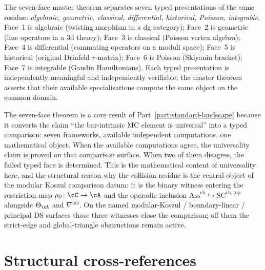 \begin{remark}
\label{rem:hdm-methodological-hierarchy}
The seven-face master theorem separates seven typed presentations of
the same residue: \emph{algebraic, geometric, classical, differential,
historical, Poisson, integrable}. Face~1 is algebraic
\textup{(}twisting morphism in a dg category\textup{)}; Face~2 is
geometric \textup{(}line operators in a 3d theory\textup{)}; Face~3
is classical \textup{(}Poisson vertex algebra\textup{)}; Face~4 is
differential \textup{(}commuting operators on a moduli space\textup{)};
Face~5 is historical \textup{(}original Drinfeld $r$-matrix\textup{)};
Face~6 is Poisson \textup{(}Sklyanin bracket\textup{)}; Face~7 is
integrable \textup{(}Gaudin Hamiltonians\textup{)}. Each typed
presentation is independently meaningful and independently verifiable;
the master theorem asserts that their available specialisations compute
the same object on the common domain.
\end{remark}

The seven-face theorem is a core result of Part~\ref{part:standard-landscape}
because it converts the claim ``the bar-intrinsic MC element is
universal'' into a typed comparison: seven frameworks, available
independent computations, one mathematical object. When the available
computations agree, the universality claim is proved on that comparison
surface. When two of them disagree, the failed typed face is determined.
This is the mathematical content of universality here, and the structural
reason why the collision residue is
the central object of the modular Koszul comparison datum: it is the
binary witness entering the restriction map
$\rho_{\partial}\colon\cC\to\cA$ and the operadic inclusion
$\mathrm{Ass}^{\mathrm{ch}}\hookrightarrow\mathrm{SC}^{\mathrm{ch,top}}$
alongside $\Theta_\cA$ and $\nabla^{\mathrm{hol}}$. On the named
modular-Koszul / boundary-linear / principal DS surfaces those three
witnesses close the comparison; off them the strict-edge and
global-triangle obstructions remain active.

\section{Structural cross-references}
\label{sec:hdm-anchors}

